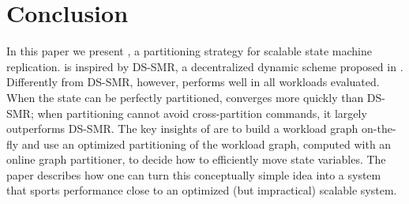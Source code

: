 \section{Conclusion}
\label{sec:conclusion}

In this paper we present \dynastar, a partitioning strategy for scalable state machine replication.
\dynastar is inspired by DS-SMR, a decentralized dynamic scheme proposed in \cite{hoang2016}.
Differently from DS-SMR, however, \dynastar performs well in all workloads evaluated.
When the state can be perfectly partitioned, \dynastar converges more quickly than DS-SMR; when partitioning cannot avoid cross-partition commands, it largely outperforms DS-SMR.
The key insights of \dynastar are to build a workload graph on-the-fly and use an optimized partitioning of the workload graph, computed with an online graph partitioner, to decide how to efficiently move state variables.
The paper describes how one can turn this conceptually simple idea into a system that sports performance close to an optimized (but impractical) scalable system.
